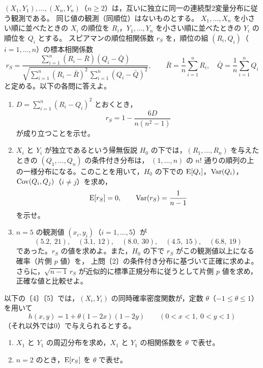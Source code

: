 \documentclass[a4paper,11pt]{ltjsarticle}
\begin{document}
$(X_1,Y_1),\ldots,(X_n,Y_n)$（$n\ge2$）は，互いに独立に同一の連続型2変量分布に従う観測である。
同じ値の観測（同順位）はないものとする。
$X_1,\ldots,X_n$ を小さい順に並べたときの $X_i$ の順位を $R_i$，$Y_1,\ldots,Y_n$ を小さい順に並べたときの $Y_i$ の順位を $Q_i$ とする。
スピアマンの順位相関係数 $r_S$ を，順位の組 $(R_i,Q_i)$（$i=1,\ldots,n$）の標本相関係数
\[
r_S=\frac{\sum_{i=1}^n(R_i-\bar R)(Q_i-\bar Q)}{\sqrt{\sum_{i=1}^n(R_i-\bar R)^2\,\sum_{i=1}^n(Q_i-\bar Q)^2}},
\qquad \bar R=\frac1n\sum_{i=1}^nR_i,\quad \bar Q=\frac1n\sum_{i=1}^nQ_i
\]
と定める。以下の各問に答えよ。
\begin{enumerate}
\item $D=\sum_{i=1}^n(R_i-Q_i)^2$ とおくとき，
\[
r_S=1-\frac{6D}{n(n^2-1)}
\]
が成り立つことを示せ。
\item $X_i$ と $Y_i$ が独立であるという帰無仮説 $H_0$ の下では，$(R_1,\ldots,R_n)$ を与えたときの $(Q_1,\ldots,Q_n)$ の条件付き分布は，
$(1,\ldots,n)$ の $n!$ 通りの順列の上の一様分布になる。このことを用いて，$H_0$ の下での
$\operatorname{E}[Q_i]$，$\operatorname{Var}(Q_i)$，$\operatorname{Cov}(Q_i,Q_j)$（$i\ne j$）を求め，
\[
\operatorname{E}[r_S]=0,\qquad \operatorname{Var}(r_S)=\frac{1}{n-1}
\]
を示せ。
\item $n=5$ の観測値 $(x_i,y_i)$（$i=1,\ldots,5$）が
\[
(5.2,\ 21),\quad(3.1,\ 12),\quad(8.0,\ 30),\quad(4.5,\ 15),\quad(6.8,\ 19)
\]
であった。$r_S$ の値を求めよ。また，$H_0$ の下で $r_S$ がこの観測値以上になる確率（片側 $p$ 値）を，
上問〔2〕の条件付き分布に基づいて正確に求めよ。さらに，$\sqrt{n-1}\,r_S$ が近似的に標準正規分布に従うとして片側 $p$ 値を求め，正確な値と比較せよ。
\end{enumerate}
以下の〔4〕〔5〕では，$(X_i,Y_i)$ の同時確率密度関数が，定数 $\theta$（$-1\le\theta\le1$）を用いて
\[
h(x,y)=1+\theta(1-2x)(1-2y)\qquad(0<x<1,\ 0<y<1)
\]
（それ以外では0）で与えられるとする。
\begin{enumerate}[resume]
\item $X_1$ と $Y_1$ の周辺分布を求め，$X_1$ と $Y_1$ の相関係数を $\theta$ で表せ。
\item $n=2$ のとき，$\operatorname{E}[r_S]$ を $\theta$ で表せ。
\end{enumerate}
\newpage
\end{document}
